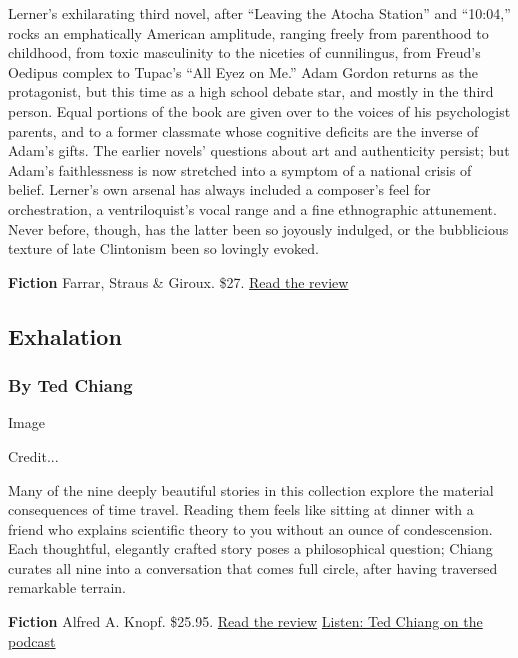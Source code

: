 Lerner's exhilarating third novel, after ``Leaving the Atocha Station''
and ``10:04,'' rocks an emphatically American amplitude, ranging freely
from parenthood to childhood, from toxic masculinity to the niceties of
cunnilingus, from Freud's Oedipus complex to Tupac's ``All Eyez on Me.''
Adam Gordon returns as the protagonist, but this time as a high school
debate star, and mostly in the third person. Equal portions of the book
are given over to the voices of his psychologist parents, and to a
former classmate whose cognitive deficits are the inverse of Adam's
gifts. The earlier novels' questions about art and authenticity persist;
but Adam's faithlessness is now stretched into a symptom of a national
crisis of belief. Lerner's own arsenal has always included a composer's
feel for orchestration, a ventriloquist's vocal range and a fine
ethnographic attunement. Never before, though, has the latter been so
joyously indulged, or the bubblicious texture of late Clintonism been so
lovingly evoked.

\textbf{Fiction} \textbar{} Farrar, Straus \& Giroux. \$27. \textbar{}
\href{https://www.nytimes3xbfgragh.onion/2019/10/03/books/review/topeka-school-ben-lerner.html}{Read
the review}

\hypertarget{exhalation}{%
\subsection{Exhalation}\label{exhalation}}

\hypertarget{by-ted-chiang}{%
\subsubsection{By Ted Chiang}\label{by-ted-chiang}}

Image

Credit...

Many of the nine deeply beautiful stories in this collection explore the
material consequences of time travel. Reading them feels like sitting at
dinner with a friend who explains scientific theory to you without an
ounce of condescension. Each thoughtful, elegantly crafted story poses a
philosophical question; Chiang curates all nine into a conversation that
comes full circle, after having traversed remarkable terrain.

\textbf{Fiction} \textbar{} Alfred A. Knopf. \$25.95. \textbar{}
\href{https://www.nytimes3xbfgragh.onion/2019/05/29/books/review/new-science-fiction-time-travel.html}{Read
the review} \textbar{}
\href{https://www.nytimes3xbfgragh.onion/2019/07/26/books/review/podcast-ted-chiang-exhalation-helen-phillips-need.html}{Listen:
Ted Chiang on the podcast}

